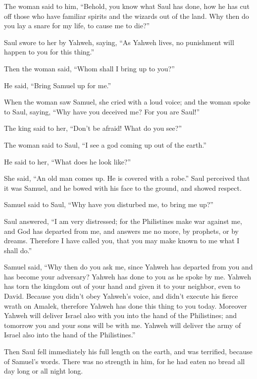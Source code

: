  The woman said to him, ``Behold, you know what Saul has
done, how he has cut off those who have familiar spirits and the wizards
out of the land. Why then do you lay a snare for my life, to cause me to
die?''

 Saul swore to her by Yahweh, saying, ``As Yahweh lives,
no punishment will happen to you for this thing.''

 Then the woman said, ``Whom shall I bring up to you?''

He said, ``Bring Samuel up for me.''

 When the woman saw Samuel, she cried with a loud voice;
and the woman spoke to Saul, saying, ``Why have you deceived me? For you
are Saul!''

 The king said to her, ``Don't be afraid! What do you
see?''

The woman said to Saul, ``I see a god coming up out of the earth.''

 He said to her, ``What does he look like?''

She said, ``An old man comes up. He is covered with a robe.'' Saul
perceived that it was Samuel, and he bowed with his face to the ground,
and showed respect.

 Samuel said to Saul, ``Why have you disturbed me, to
bring me up?''

Saul answered, ``I am very distressed; for the Philistines make war
against me, and God has departed from me, and answers me no more, by
prophets, or by dreams. Therefore I have called you, that you may make
known to me what I shall do.''

 Samuel said, ``Why then do you ask me, since Yahweh has
departed from you and has become your adversary?  Yahweh
has done to you as he spoke by me. Yahweh has torn the kingdom out of
your hand and given it to your neighbor, even to David. 
Because you didn't obey Yahweh's voice, and didn't execute his fierce
wrath on Amalek, therefore Yahweh has done this thing to you today.
 Moreover Yahweh will deliver Israel also with you into
the hand of the Philistines; and tomorrow you and your sons will be with
me. Yahweh will deliver the army of Israel also into the hand of the
Philistines.''

 Then Saul fell immediately his full length on the earth,
and was terrified, because of Samuel's words. There was no strength in
him, for he had eaten no bread all day long or all night long.

